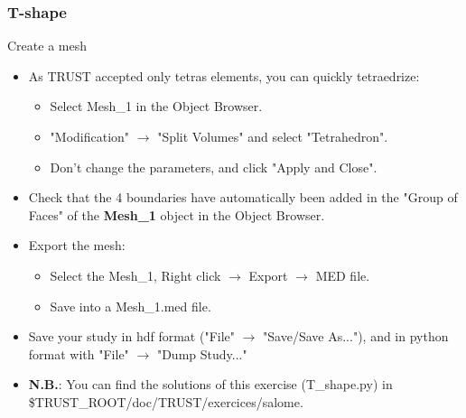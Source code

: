 \documentclass[10pt, hyperref={unicode=true,pdfusetitle, bookmarks=true,bookmarksnumbered=false,bookmarksopen=false, breaklinks=false,pdfborder={0 0l 1},backref=true,colorlinks=true,linkcolor=darkblue,pageanchor}]{beamer}
\begin{document}
\begin{frame}
\frametitle{T-shape}
\begin{block}{Create a mesh}

\begin{itemize}
\item As TRUST accepted only tetras elements, you can quickly tetraedrize:
    \begin{itemize}
    \item [$\circ$] Select Mesh\_1 in the Object Browser.
    \item [$\circ$] "Modification" $\rightarrow$ "Split Volumes" and select "Tetrahedron".
    \item [$\circ$] Don't change the parameters, and click "Apply and Close".
    \end{itemize}

\item Check that the 4 boundaries have automatically been added in the "Group of Faces" of the \textbf{Mesh\_1} object in the Object Browser.

\item Export the mesh:
    \begin{itemize}
    \item [$\circ$] Select the Mesh\_1, Right click $\rightarrow$ Export $\rightarrow$ MED file.
    \item [$\circ$] Save into a Mesh\_1.med file.
    \end{itemize}

\item Save your study in hdf format ("File" $\rightarrow$ "Save/Save As..."), and in python format with "File" $\rightarrow$ "Dump Study..."

\item \textbf{N.B.}: You can find the solutions of this exercise (T\_shape.py) in \$TRUST\_ROOT/doc/TRUST/exercices/salome.
\end{itemize}

\end{block}
\end{frame}
\end{document}
